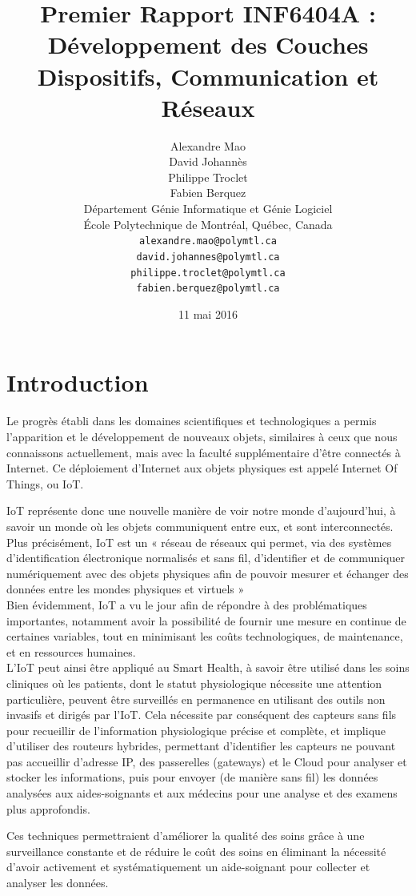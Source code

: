 \documentclass{article}
\title{Premier Rapport INF6404A : Développement des Couches Dispositifs, Communication et Réseaux}
\author{
	Alexandre Mao\\
	David Johannès \\
	Philippe Troclet \\
	Fabien Berquez \\
	D\'{e}partement G\'{e}nie Informatique et G\'{e}nie Logiciel \\
	\'{E}cole Polytechnique de Montr\'{e}al, Qu\'{e}bec, Canada \\
	\texttt{alexandre.mao@polymtl.ca}\\
	\texttt{david.johannes@polymtl.ca}\\
	\texttt{philippe.troclet@polymtl.ca}   \\
	\texttt{fabien.berquez@polymtl.ca}   \\
}
\date{11 mai 2016}
\begin{document}
\maketitle

\section{Introduction}

Le progrès établi dans les domaines scientifiques et technologiques a permis l’apparition et le développement de nouveaux objets, similaires à ceux que nous connaissons actuellement, mais avec la faculté supplémentaire d’être connectés à Internet. Ce déploiement d’Internet aux objets physiques est appelé Internet Of Things, ou IoT.

IoT représente donc une nouvelle manière de voir notre monde d’aujourd'hui, à savoir un monde où les objets communiquent entre eux, et sont interconnectés. Plus précisément, IoT est un « réseau de réseaux qui permet, via des systèmes d’identification électronique normalisés et sans fil, d’identifier et de communiquer numériquement avec des objets physiques afin de pouvoir mesurer et échanger des données entre les mondes physiques et virtuels » \cite{benghozi2009internet}
\\

Bien évidemment, IoT a vu le jour afin de répondre à des problématiques importantes, notamment avoir la possibilité de fournir une mesure en continue de certaines variables, tout en minimisant les coûts technologiques, de maintenance, et en ressources humaines.
\\

L’IoT peut ainsi être appliqué au Smart Health, à savoir être utilisé dans les soins cliniques où les patients, dont le statut physiologique nécessite une attention particulière, peuvent être surveillés en permanence en utilisant des outils non invasifs et dirigés par l’IoT. Cela nécessite par conséquent des capteurs sans fils pour recueillir de l'information physiologique précise et complète, et implique d’utiliser des routeurs hybrides, permettant d'identifier les capteurs ne pouvant pas accueillir d'adresse IP, des passerelles (gateways) et le Cloud pour analyser et stocker les informations, puis pour envoyer (de manière sans fil) les données analysées aux aides-soignants et aux médecins pour une analyse et des examens plus approfondis.

Ces techniques permettraient d’améliorer la qualité des soins grâce à une surveillance constante et de réduire le coût des soins en éliminant la nécessité d’avoir activement et systématiquement un aide-soignant pour collecter et analyser les données.
\end{document}
